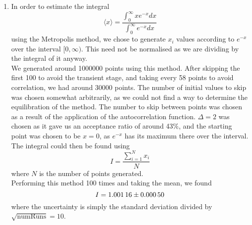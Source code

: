 \documentclass[11pt]{article}
\begin{document}
\begin{enumerate}
    \item In order to estimate the integral
    \begin{equation}
        \langle x \rangle =\frac{\int_0^\infty x e^{-x}dx}{\int_0^\infty e^{-x}dx}
    \end{equation}
    using the Metropolis method, we chose to generate $x_i$ values according to $e^{-x}$ over the interval $[0,\infty)$. This need not be normalised as we are dividing by the integral of it anyway.\\
    We generated around \num[]{1000000} points using this method. After skipping the first 100 to avoid the transient stage, and taking every 58 points to avoid correlation, we had around \num[]{30000} points. The number of initial values to skip was chosen somewhat arbitrarily, as we could not find a way to determine the equilibration of the method. The number to skip between points was chosen as a result of the application of the autocorrelation function. $\Delta=2$ was chosen as it gave us an acceptance ratio of around 43\%, and the starting point was chosen to be $x=0$, as $e^{-x}$ has its maximum there over the interval.\\
    The integral could then be found using 
    \begin{equation}
        I=\frac{\sum_{i=1}^N x_i}{N}
        \label{eqn:q2Int}
    \end{equation}
    where $N$ is the number of points generated.\\
    Performing this method 100 times and taking the mean, we found
    \begin{equation}
        I=\num[]{1.00116 \pm 0.00050}
    \end{equation}
    where the uncertainty is simply the standard deviation divided by $\sqrt{\mathrm{numRuns}}=10$.
\end{enumerate}
\end{document}

